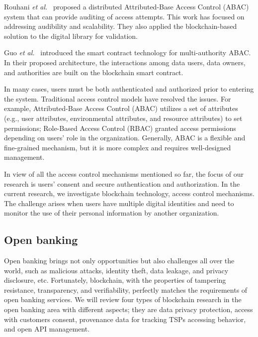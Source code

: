 Rouhani \emph{et al.}~\cite{rouhani2020distributed} proposed a distributed Attributed-Base Access Control (ABAC) system that can provide auditing of access attempts. This work has focused on addressing audibility and scalability. They also applied the blockchain-based solution to the digital library for validation.\par

Guo \emph{et al.}~\cite{guo2019multi} introduced the smart contract technology for multi-authority ABAC. In their proposed architecture, the interactions among data users, data owners, and authorities are built on the blockchain smart contract.\par

In many cases, users must be both authenticated and authorized prior to entering the system. Traditional access control models have resolved the issues. For example, Attributed-Base Access Control (ABAC) utilizes a set of attributes (e.g., user attributes, environmental attributes, and resource attributes) to set permissions; Role-Based Access Control (RBAC) granted access permissions depending on users' role in the organization. Generally, ABAC is a flexible and fine-grained mechanism, but it is more complex and requires well-designed management.\par

In view of all the access control mechanisms mentioned so far, the focus of our research is users' consent and secure authentication and authorization. In the current research, we investigate blockchain technology, access control mechanisms. The challenge arises when users have multiple digital identities and need to monitor the use of their personal information by another organization.\par

\subsection{Open banking}
Open banking brings not only opportunities but also challenges all over the world, such as malicious attacks, identity theft, data leakage, and privacy disclosure, etc. Fortunately, blockchain, with the properties of tampering resistance, transparency, and verifiability, perfectly matches the requirements of open banking services. We will review four types of blockchain research in the open banking area with different aspects; they are data privacy protection, access with customers consent, provenance data for tracking TSPs accessing behavior, and open API management.\par

